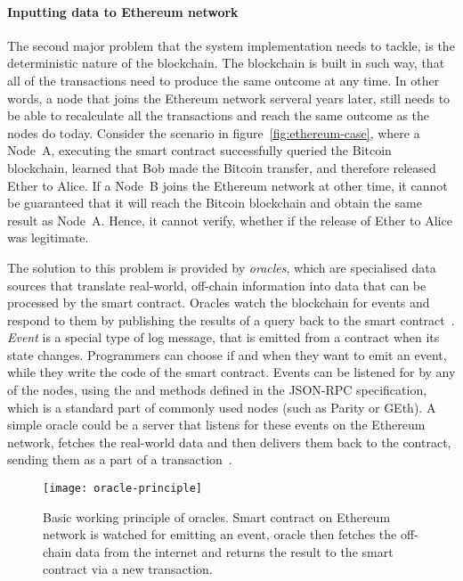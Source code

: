 \paragraph{Inputting data to Ethereum network}
The second major problem that the system implementation needs to tackle, is the deterministic nature of the blockchain. The blockchain is built in such way, that all of the transactions need to produce the same outcome at any time. In other words, a node that joins the Ethereum network serveral years later, still needs to be able to recalculate all the transactions and reach the same outcome as the nodes do today. Consider the scenario in figure~\ref{fig:ethereum-case}, where a Node~A, executing the smart contract successfully queried the Bitcoin blockchain, learned that Bob made the Bitcoin transfer, and therefore released Ether to Alice. If a Node~B joins the Ethereum network at other time, it cannot be guaranteed that it will reach the Bitcoin blockchain and obtain the same result as Node~A. Hence, it cannot verify, whether if the release of Ether to Alice was legitimate.

The solution to this problem is provided by \textit{oracles}, which are specialised data sources that translate real-world, off-chain information into data that can be processed by the smart contract. Oracles watch the blockchain for events and respond to them by publishing the results of a query back to the smart contract~\cite{JohnWeldon2016BuildingContract}. \textit{Event} is a special type of log message, that is emitted from a contract when its state changes. Programmers can choose if and when they want to emit an event, while they write the code of the smart contract. Events can be listened for by any of the nodes, using the  and  methods defined in the JSON-RPC specification\footnotemark, which is a standard part of commonly used nodes (such as Parity or GEth). A simple oracle could be a server that listens for these events on the Ethereum network, fetches the real-world data and then delivers them back to the contract, sending them as a part of a transaction~\cite{JulesDourlens2017Oracles:Blockchain, 2018OraclizeDocumentation}. 
% 
% 
\begin{figure}[ht]
    \centering
    \texttt{[image: oracle-principle]}
    \caption{Basic working principle of oracles. Smart contract on Ethereum network is watched for emitting an event, oracle then fetches the off-chain data from the internet and returns the result to the smart contract via a new transaction.}
    \label{fig:oracles-principle}
\end{figure}



